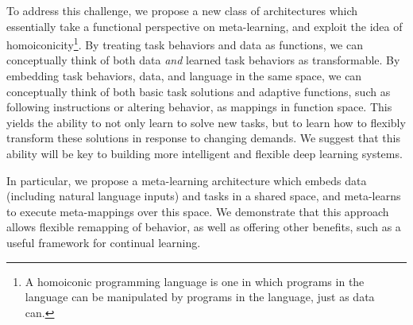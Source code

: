 \documentclass{article}
\begin{document}
To address this challenge, we propose a new class of architectures which essentially take a functional perspective on meta-learning, and exploit the idea of homoiconicity\footnote{A homoiconic programming language is one in which programs in the language can be manipulated by programs in the language, just as data can.}. By treating task behaviors and data as functions, we can conceptually think of both data \emph{and} learned task behaviors as transformable. By embedding task behaviors, data, and language in the same space, we can conceptually think of both basic task solutions and adaptive functions, such as following instructions or altering behavior, as mappings in function space. This yields the ability to not only learn to solve new tasks, but to learn how to flexibly transform these solutions in response to changing demands. We suggest that this ability will be key to building more intelligent and flexible deep learning systems. \par
In particular, we propose a meta-learning architecture which embeds data (including natural language inputs) and tasks in a shared space, and meta-learns to execute meta-mappings over this space. We demonstrate that this approach allows flexible remapping of behavior, as well as offering other benefits, such as a useful framework for continual learning. \par
\end{document}
